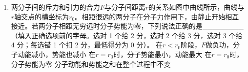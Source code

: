 \documentclass[\gkver]{gaokaozhenti}
\begin{document}
\begin{enumerate}
{（2）粒子$P$在$t_{0}=T/4$时刻开始运动，在$t=T/4$到$t=T/2$时间内沿顺时针方向运动$1/4$个圆周，到达$C$点，此时磁场方向反转；继而，在$t=T/2$到$t=T$时间内沿逆时针方向运动半个圆周，到达$B$点，此时磁场方向再次反转；在$t=T$到$t=5T/4$时间内沿顺时针方向运动$1/4$个圆周，到达$A$点，如图（b）所示。由几何关系可知，$A$点在$y$轴上，即$OA$与$x$轴的夹角
$\theta=\frac{\pi}{2}$ ⑤

（3）若在任意时刻$t=t_{0}$（$0<t_{0}<T/4$）粒子$P$开始运动，在$t=t_{0}$到$t=T/2$时间内沿顺时针方向做圆周运动到达$C$点，圆心$O'$位于$x$轴上，圆弧$\widehat{OC}$对应的圆心角为
$\angle OO'C=\frac{2\pi}{T}\left(\frac{T}{2}-t_{0}\right)$ ⑥
此时磁场方向反转；继而，在$t=T/2$到$t=T$时间内沿逆时针方向运动半个圆周，到达$B$点，此时磁场方向再次反转；在$t=T$到$t=T+t_{0}$时间内沿顺时针方向做圆周运动到达$A$点，设圆$O''$，圆弧$\widehat{BA}$对应的圆心角为
$\angle BO''A=\frac{2\pi}{T}t_{0}$ ⑦
如图（c）所示，由几何关系可知，$C$、$B$均在$O'O''$连线上，且$OA\parallel O'O''$ ⑧
若要$OA$与$x$轴成$\pi/4$角，则有$\angle OO'C=\frac{3\pi}{4}$ ⑨
联立⑥⑨式可得
$t_{0}=\frac{T}{8}$ ⑩
{figs/16_an2.png}
{figs/16_an3.png}
}

\item
两分子间的斥力和引力的合力$F$与分子间距离$r$的关系如图中曲线所示，曲线与$r$轴交点的横坐标为$r_{0}$。相距很远的两分子在分子力作用下，由静止开始相互接近。若两分子相距无穷远时分子势能为零，下列说法正确的是\_\_\_\_\_\_\_\_（填入正确选项前的字母。选对 1 个给 2 分，选对 2 个给 3 分，选对 3 个给 4 分；每选错 1 个扣 2 分，最低得分为 0 分）。
{在$r<r_{0}$阶段，$F$做负功，分子动能减小，势能也减小}
{在$r=r_{0}$时，分子势能最小，动能最大}
{在$r=r_{0}$时，分子势能为零}
{分子动能和势能之和在整个过程中不变}


\end{enumerate}
\end{document}
